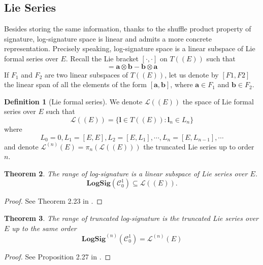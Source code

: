 \documentclass[12pt]{report}
\newtheorem{theorem}{Theorem}[chapter]
\theoremstyle{definition}
\newtheorem{definition}[theorem]{Definition}
\theoremstyle{remark}
\begin{document}
\subsection{Lie Series}
Besides storing the same information, thanks to the shuffle product property of signature, log-signature space is linear and admits a more concrete representation. Precisely speaking, log-signature space is a linear subspace of Lie formal series over $E$. Recall the Lie bracket $[\cdot, \cdot]$ on $T((E))$ such that 
\begin{equation}
  [\mathbf{a},\mathbf{b}] = \mathbf{a}\otimes\mathbf{b} - \mathbf{b}\otimes\mathbf{a}
\end{equation}
If $F_{1}$ and $F_2$ are two linear subspaces of $T((E))$, let us denote by $[F1, F2]$ the linear span of all the elements of the form $[\mathbf{a}, \mathbf{b}]$, where $\mathbf{a} \in F_{1}$ and $\mathbf{b} \in F_{2}$.
\begin{definition}[Lie formal series]
  We denote $\mathcal{L}((E))$ the space of Lie formal series over $E$ such that 
  \begin{equation}
    \mathcal{L}((E)) = \{\mathbf{l} \in T((E)) \colon \mathbf{l}_{n} \in L_{n}\}
  \end{equation} 
  where 
  \begin{equation}
    L_{0} = 0, L_{1} = [E,E], L_{2} = [E,L_{1}], \cdots ,L_{n} = [E,L_{n-1}], \cdots
  \end{equation}
  and denote $\mathcal{L}^{(n)}(E) = \pi_{n}(\mathcal{L}((E)))$ the truncated Lie series up to order $n$.
\end{definition}
\begin{theorem}
  The range of log-signature is a linear subspace of Lie series over $E$.
  \begin{equation}
    \mathbf{LogSig}(\mathcal{C}_{0}^{1})\subseteq\mathcal{L}((E)).
  \end{equation}
\end{theorem}
\begin{proof}
  See Theorem 2.23 in \cite{lyons2007differential}.
\end{proof}
\begin{theorem}\label{truncatedLieseries}
  The range of truncated log-signature is the truncated Lie series over $E$ up to the same order
  \begin{equation}
    \mathbf{LogSig}^{(n)}(\mathcal{C}_{0}^{1}) = \mathcal{L}^{(n)}(E)
  \end{equation}
\end{theorem}
\begin{proof}
  See Proposition 2.27 in \cite{lyons2007differential}.
\end{proof}
\end{document}
